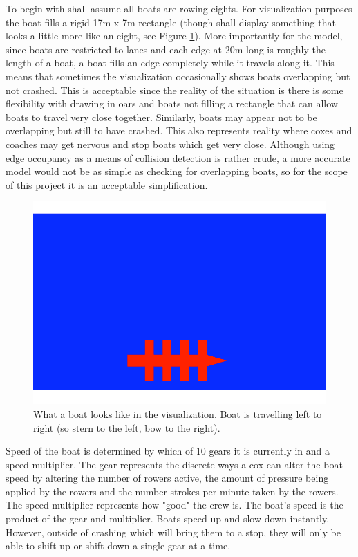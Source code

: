       To begin with shall assume all boats are rowing eights. For visualization purposes the boat fills a rigid 17m x 7m rectangle (though shall display something that looks a little more like an eight, see Figure \ref{fig:model:boat}). More importantly for the model, since boats are restricted to lanes and each edge at 20m long is roughly the length of a boat, a boat fills an edge completely while it travels along it. This means that sometimes the visualization occasionally shows boats overlapping but not crashed. This is acceptable since the reality of the situation is there is some flexibility with drawing in oars and boats not filling a rectangle that can allow boats to travel very close together. Similarly, boats may appear not to be overlapping but still to have crashed. This also represents reality where coxes and coaches may get nervous and stop boats which get very close. Although using edge occupancy as a means of collision detection is rather crude, a more accurate model would not be as simple as checking for overlapping boats, so for the scope of this project it is an acceptable simplification.
      
      \begin{figure}[h]
      \begin{center}
      	\includegraphics[scale=0.3]{images/boat.png}
      	\caption{What a boat looks like in the visualization. Boat is travelling left to right (so stern to the left, bow to the right).}
      	\label{fig:model:boat}
      \end{center}
      \end{figure}
      
      Speed of the boat is determined by which of 10 gears it is currently in and a speed multiplier. The gear represents the discrete ways a cox can alter the boat speed by altering the number of rowers active, the amount of pressure being applied by the rowers and the number strokes per minute taken by the rowers. The speed multiplier represents how "good" the crew is. The boat's speed is the product of the gear and multiplier. Boats speed up and slow down instantly. However, outside of crashing which will bring them to a stop, they will only be able to shift up or shift down a single gear at a time.
      
